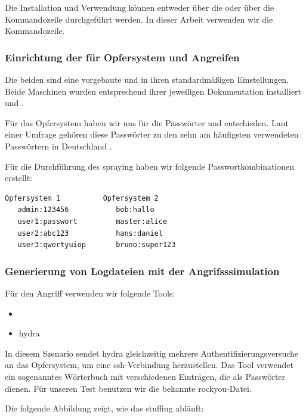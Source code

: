 Die Installation und Verwendung können entweder über die  oder über die Kommandozeile durchgeführt werden. In dieser Arbeit verwenden wir die Kommandozeile.

\subsubsection{Einrichtung der  für Opfersystem und Angreifen}
Die beiden  sind eine vorgebaute  und  in ihren standardmäßigen Einstellungen. Beide Maschinen wurden entsprechend ihrer jeweiligen Dokumentation installiert \citep{kali_vm} und \citep{Ubuntu_server}.

\newpage
Für das Opfersystem haben wir uns für die Passwörter  und  entschieden. Laut einer Umfrage gehören diese Passwörter zu den zehn am häufigsten verwendeten Passwörtern in Deutschland \citep{silicon_passwort}.

Für die Durchführung des \gls{spraying} haben wir folgende Passwortkombinationen erstellt:

{
\begin{lstlisting}[frame=single]
   Opfersystem 1          Opfersystem 2  
   admin:123456           bob:hallo
   user1:passwort         master:alice
   user2:abc123           hans:daniel
   user3:qwertyuiop       bruno:super123
\end{lstlisting}
}

\subsubsection{Generierung von Logdateien mit der Angrifsssimulation}
Für den Angriff verwenden wir folgende Tools:

{
\begin{itemize}[noitemsep]
   \item	{}
   \item \gls{hydra}
\end{itemize}
}

In diesem Szenario sendet \gls{hydra} gleichzeitig mehrere Authentifizierungsversuche an das Opfersystem, um eine \gls{ssh}-Verbindung herzustellen. Das Tool verwendet ein sogenanntes Wörterbuch mit verschiedenen Einträgen, die als Passwörter dienen. Für unseren Test benutzen wir die bekannte \gls{rockyou}-Datei.

\newpage
Die folgende Abbildung zeigt, wie das \gls{stuffing} abläuft:

